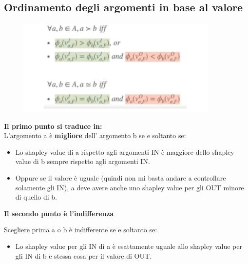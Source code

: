 \subsection{Ordinamento degli argomenti in base al valore}
\begin{figure}[htp]
	\centering
    \includegraphics[width=10cm, keepaspectratio]{img/Cap8/ordinamento-valore.png}
\end{figure}
\textbf{Il primo punto si traduce in:}
\\L’argomento a è \textbf{migliore} dell’ argomento b se e soltanto se:
\begin{itemize}
    \item Lo shapley value di a rispetto agli argomenti IN è maggiore dello shapley value di b sempre rispetto agli argomenti IN.
    \item Oppure se il valore è uguale (quindi non mi basta andare a controllare solamente gli IN), a deve avere anche uno shapley value per gli OUT minore di quello di b.
\end{itemize}
\begin{center}
     \textbf{Il secondo punto è l’indifferenza}
\end{center}
 Scegliere prima a o b è indifferente se e soltanto se:
\begin{itemize}
    \item Lo shapley value per gli IN di a è esattamente uguale allo shapley value per gli IN di b e stessa cosa per il valore di OUT. 
\end{itemize}
    
    